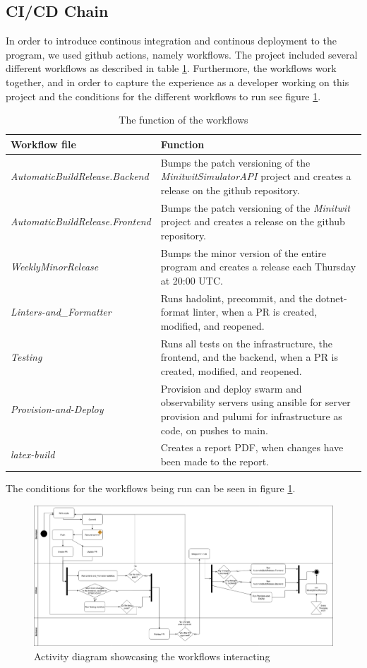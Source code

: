 \subsection{CI/CD Chain} %

In order to introduce continous integration and continous deployment to the program, we used github actions, namely workflows. The project included several different workflows as described in table \ref{tab:workflows}. Furthermore, the workflows work together, and in order to capture the experience as a developer working on this project and the conditions for the different workflows to run see figure \ref{fig:workflows}.

\begin{table}[]
    \centering
    \begin{tabular}{l|l}
        \textbf{Workflow file} & \textbf{Function}\\
        \hline
        \textit{AutomaticBuildRelease.Backend} &  Bumps the patch versioning of the \textit{MinitwitSimulatorAPI} project and creates a release on the github repository.\\
        \textit{AutomaticBuildRelease.Frontend} & Bumps the patch versioning of the \textit{Minitwit} project and creates a release on the github repository.\\
        \textit{WeeklyMinorRelease} & Bumps the minor version of the entire program and creates a release each Thursday at 20:00 UTC.\\
        \textit{Linters-and\_Formatter} & Runs hadolint, precommit, and the dotnet-format linter, when a PR is created, modified, and reopened.\\
        \textit{Testing} & Runs all tests on the infrastructure, the frontend, and the backend, when a PR is created, modified, and reopened.\\
        \textit{Provision-and-Deploy} & Provision and deploy swarm and observability servers using ansible for server provision and pulumi for infrastructure as code, on pushes to main.\\
        \textit{latex-build} & Creates a report PDF, when changes have been made to the report.
    \end{tabular}
    \caption{The function of the workflows}
    \label{tab:workflows}
\end{table}

The conditions for the workflows being run can be seen in figure \ref{fig:workflows}.

\begin{figure}
    \centering
    \includegraphics{report/images/Github-Actions.png}
    \caption{Activity diagram showcasing the workflows interacting }
    \label{fig:workflows}
\end{figure}

